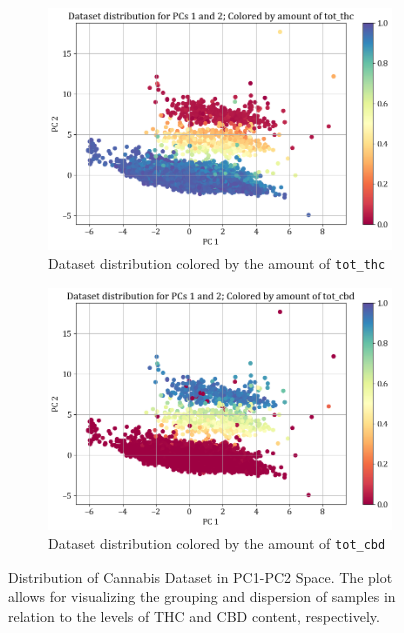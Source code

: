 \documentclass[11pt,a4paper]{article}
\begin{document}
\begin{figure}[H]
     \centering
     \begin{subfigure}[b]{0.475\textwidth}
         \centering
         \includegraphics[width=\textwidth]{images/pc_1_2_tot_thc.png}
         \caption{Dataset distribution colored by the amount of \texttt{tot\_thc}}
         \label{fig:tot_thc}
     \end{subfigure}
     \hfill
     \begin{subfigure}[b]{0.475\textwidth}
         \centering
         \includegraphics[width=\textwidth]{images/pc_1_2_tot_cbd.png}
         \caption{Dataset distribution colored by the amount of \texttt{tot\_cbd}}
         \label{fig:tot_cbd}
     \end{subfigure}
    \caption{Distribution of Cannabis Dataset in PC1-PC2 Space. The plot allows for visualizing the grouping and dispersion of samples in relation to the levels of THC and CBD content, respectively.}
    \label{fig:thc_cbd}
\end{figure}
\end{document}
